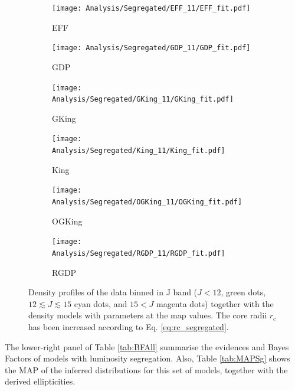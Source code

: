 \begin {figure}
\centering
\begin{subfigure}[t]{0.45\textwidth}
 \texttt{[image: Analysis/Segregated/EFF\_11/EFF\_fit.pdf]}
 \caption{EFF}  
    \end{subfigure}
    \begin{subfigure}[t]{0.45\textwidth}
 \texttt{[image: Analysis/Segregated/GDP\_11/GDP\_fit.pdf]}
 \caption{GDP}  
    \end{subfigure}
    \begin{subfigure}[t]{0.45\textwidth}
 \texttt{[image: Analysis/Segregated/GKing\_11/GKing\_fit.pdf]}
 \caption{GKing}  
    \end{subfigure}
    \begin{subfigure}[t]{0.45\textwidth}
 \texttt{[image: Analysis/Segregated/King\_11/King\_fit.pdf]}
 \caption{King}  
    \end{subfigure}
    \begin{subfigure}[t]{0.45\textwidth}
 \texttt{[image: Analysis/Segregated/OGKing\_11/OGKing\_fit.pdf]}
 \caption{OGKing}  
    \end{subfigure}
        \begin{subfigure}[t]{0.45\textwidth}
 \texttt{[image: Analysis/Segregated/RGDP\_11/RGDP\_fit.pdf]}
 \caption{RGDP}  
    \end{subfigure}
  \caption{Density profiles of the data binned in J band ($J < 12$, green dots, $12 \lesssim J \lesssim 15$ cyan dots, and $15 < J$ magenta dots) together with the density models with parameters at the \gls{map} values. The core radii $r_c$ has been increased according to Eq. \ref{eq:rc_segregated}.}
\label{fig:Segregated}
\end {figure}

The lower-right panel of Table \ref{tab:BFAll} summarise the evidences and Bayes
Factors of models with luminosity segregation. Also, Table \ref{tab:MAPSg} shows the MAP of the inferred distributions for this set of models, together with the derived ellipticities.

\begin{table}[ht!]
  \centering
      \caption[]{Maximum-a-posteriori estimates of the inferred parameters in each luminosity segregated model. Ellipticities are derived a posteriori using the inferred parameters.}
         \label{tab:MAPSg}
          \resizebox{\textwidth}{!}{
         
         }
   \end{table}
   
